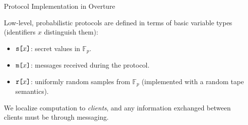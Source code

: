 \documentclass{beamer}
\begin{document}
\begin{frame}{Protocol Implementation in Overture}

  Low-level, probabilistic protocols are defined in terms of basic variable types
  (identifiers $x$ distinguish them):
  \begin{itemize}
  \item $\texttt{s[}x\texttt{]}$: secret values in $\mathbb{F}_p$.
  \item $\texttt{m[}x\texttt{]}$: messages received during the protocol.
  \item $\texttt{r[}x\texttt{]}$: uniformly random samples from $\mathbb{F}_p$ (implemented with
    a random tape semantics).
  \end{itemize}
  We localize computation to \emph{clients}, and any information
  exchanged between clients must be through messaging.
\end{frame}
\end{document}
